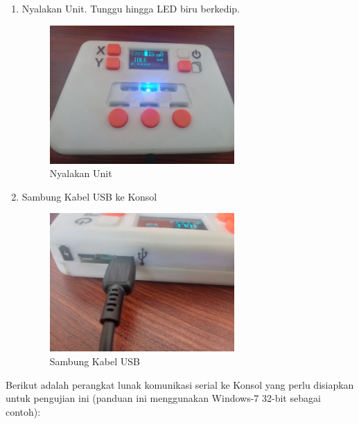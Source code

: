 \documentclass{article}
\begin{document}
\begin{enumerate}
			\newpage
			\item Nyalakan Unit. Tunggu hingga LED biru berkedip.
			\begin{figure}[H]
				\centering
				\includegraphics[width=200pt]{images/pasang/nyalakan_unit}
				\caption{Nyalakan Unit}
			\end{figure}
			\item Sambung Kabel USB ke Konsol
			\begin{figure}[H]
				\centering
				\includegraphics[width=200pt]{images/pasang/sambung_usb}
				\caption{Sambung Kabel USB}
			\end{figure}
		\end{enumerate}
	
	Berikut adalah perangkat lunak komunikasi serial ke Konsol yang perlu disiapkan untuk pengujian ini
	(panduan ini menggunakan Windows-7 32-bit sebagai contoh):
	
\end{document}
